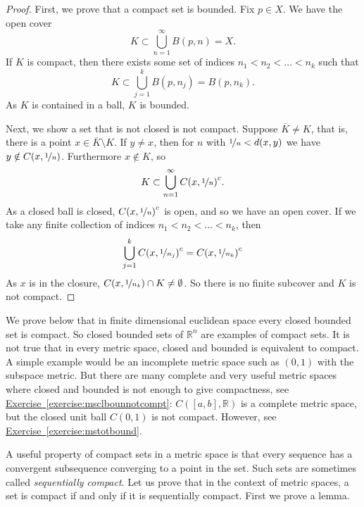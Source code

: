 \documentclass[12pt]{book}
\newcommand{\R}{{\mathbb{R}}}
\newcommand{\myindex}[1]{#1\index{#1}}
\theoremstyle{plain}
\theoremstyle{remark}
\theoremstyle{definition}
\theoremstyle{exercise}
\theoremstyle{example}
\newcommand{\exerciseref}[1]{\hyperref[#1]{Exercise~\ref*{#1}}}
\begin{document}
\begin{proof}
First, we prove that a compact set is bounded.
Fix $p \in X$.  We have the open cover
\begin{equation*}
K \subset \bigcup_{n=1}^\infty B(p,n) = X .
\end{equation*}
If $K$ is compact, then there exists some set of indices
$n_1 < n_2 < \ldots < n_k$ such that
\begin{equation*}
K \subset \bigcup_{j=1}^k B(p,n_j) = B(p,n_k) .
\end{equation*}
As $K$ is contained in a ball, $K$ is bounded.

Next, we show a set that is not closed is not compact.  Suppose 
$\overline{K} \not= K$, that is, there is a point $x \in \overline{K}
\setminus K$.
If $y \not= x$, then for $n$
with $\nicefrac{1}{n} < d(x,y)$ we have
$y \notin C(x,\nicefrac{1}{n})$. Furthermore $x \notin K$, so
\begin{equation*}
K \subset \bigcup_{n=1}^\infty {C(x,\nicefrac{1}{n})}^c .
\end{equation*}
As a closed ball is closed, ${C(x,\nicefrac{1}{n})}^c$ is open, and
so we have an open cover.
If we take any
finite collection of indices $n_1 < n_2 < \ldots < n_k$, then 
\begin{equation*}
\bigcup_{j=1}^k {C(x,\nicefrac{1}{n_j})}^c 
=
{C(x,\nicefrac{1}{n_k})}^c 
\end{equation*}
As $x$ is in the closure,
$C(x,\nicefrac{1}{n_k}) \cap K \not= \emptyset$.  So there is no
finite subcover and $K$ is not compact.
\end{proof}

We prove below that 
in finite dimensional euclidean space
every closed bounded set is compact.
So closed bounded sets
of $\R^n$ are examples of compact sets.
It is not true that in every metric space, closed and bounded is equivalent
to compact.  A simple example would be an incomplete metric space such as
$(0,1)$ with the subspace metric.
But there are many complete and very useful metric spaces where closed and bounded is not
enough to give compactness, see
\exerciseref{exercise:msclbounnotcompt}: $C([a,b],\R)$ is a complete metric
space, but the closed unit ball $C(0,1)$ is not compact.  However, see
\exerciseref{exercise:mstotbound}.

A useful property of compact sets in a metric space is that every
sequence has a convergent subsequence converging to a point in the set.
Such sets are sometimes called
\emph{\myindex{sequentially compact}}.  Let us prove that in the
context of metric spaces, a set is compact if and only if it is sequentially
compact.
First we prove a lemma.
\end{document}
